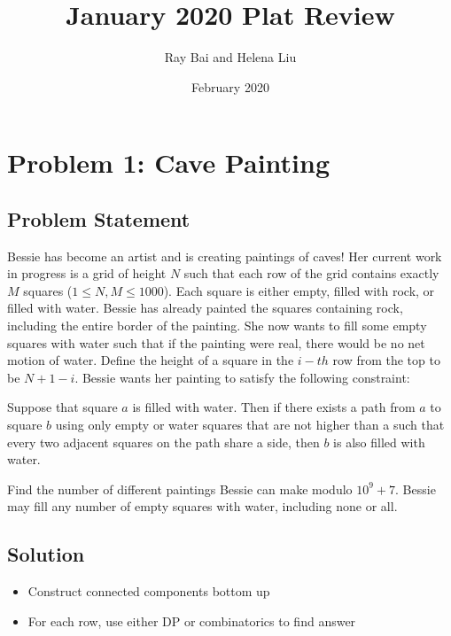 \documentclass{article}
\title{January 2020 Plat Review}
\author{Ray Bai and Helena Liu}
\date{February 2020}
\begin{document}
\maketitle

\section{Problem 1: Cave Painting}
\subsection{Problem Statement}
Bessie has become an artist and is creating paintings of caves! Her current work in progress is a grid of height $N$ such that each row of the grid contains exactly $M$ squares ($1 \leq N,M \leq 1000$). Each square is either empty, filled with rock, or filled with water. Bessie has already painted the squares containing rock, including the entire border of the painting. She now wants to fill some empty squares with water such that if the painting were real, there would be no net motion of water. Define the height of a square in the $i-th$ row from the top to be $N+1-i$. Bessie wants her painting to satisfy the following constraint:

Suppose that square $a$
is filled with water. Then if there exists a path from $a$ to square $b$ using only empty or water squares that are not higher than a such that every two adjacent squares on the path share a side, then $b$ is also filled with water.

Find the number of different paintings Bessie can make modulo $10^9+7$. Bessie may fill any number of empty squares with water, including none or all. 
\subsection{Solution}
\begin{itemize}
    \item Construct connected components bottom up 
    \item For each row, use either DP or combinatorics to find answer
\end{itemize}
\end{document}
